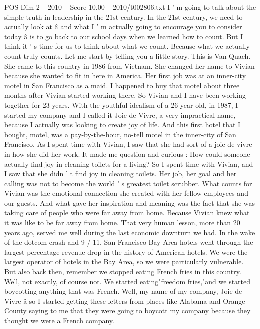 \begin{textsample}{POS Dim 2 – 2010 – Score 10.00 – 2010/t002806.txt}  \label{ex:f2_pos_077}
I ' m going to talk about the simple truth in leadership in the 21st century.
In the 21st century, we need to actually look at â and what I ' m actually going to encourage you to consider today â is to go back to our school days when we learned how to count.
But I think it ' s time for us to think about what we count.
Because what we actually count truly counts.
Let me start by telling you a little story.
This is Van Quach.
She came to this country in 1986 from Vietnam.
She changed her name to Vivian because she wanted to fit in here in America.
Her first job was at an inner-city motel in San Francisco as a maid.
I happened to buy that motel about three months after Vivian started working there.
So Vivian and I have been working together for 23 years.
With the youthful idealism of a 26-year-old, in 1987, I started my company and I called it Joie de Vivre, a very impractical name, because I actually was looking to create joy of life.
And this first hotel that I bought, motel, was a pay-by-the-hour, no-tell motel in the inner-city of San Francisco.
As I spent time with Vivian, I saw that she had sort of a joie de vivre in how she did her work.
It made me question and curious : How could someone actually find joy in cleaning toilets for a living?
So I spent time with Vivian, and I saw that she didn ' t find joy in cleaning toilets.
Her job, her goal and her calling was not to become the world ' s greatest toilet scrubber.
What counts for Vivian was the emotional connection she created with her fellow employees and our guests.
And what gave her inspiration and meaning was the fact that she was taking care of people who were far away from home.
Because Vivian knew what it was like to be far away from home.
That very human lesson, more than 20 years ago, served me well during the last economic downturn we had.
In the wake of the dotcom crash and 9 / 11, San Francisco Bay Area hotels went through the largest percentage revenue drop in the history of American hotels.
We were the largest operator of hotels in the Bay Area, so we were particularly vulnerable.
But also back then, remember we stopped eating French fries in this country.
Well, not exactly, of course not.
We started eating"freedom fries,"and we started boycotting anything that was French.
Well, my name of my company, Joie de Vivre â so I started getting these letters from places like Alabama and Orange County saying to me that they were going to boycott my company because they thought we were a French company.

\end{textsample}

